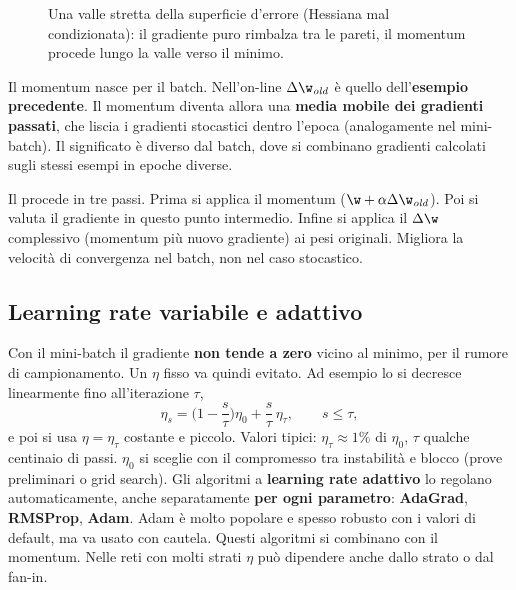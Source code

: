 \begin{figure}[ht]
\centering
{}
\caption{Una valle stretta della superficie d'errore (Hessiana mal condizionata): il gradiente puro rimbalza tra
le pareti, il momentum procede lungo la valle verso il minimo.}
\label{fig:momentum}
\end{figure}

Il momentum nasce per il batch. Nell'on-line $\Delta\w_{\mathit{old}}$ è quello dell'\textbf{esempio
precedente}. Il momentum diventa allora una \textbf{media mobile dei gradienti passati}, che liscia i gradienti
stocastici dentro l'epoca (analogamente nel mini-batch). Il significato è diverso dal batch, dove si combinano
gradienti calcolati sugli stessi esempi in epoche diverse.

Il  procede in tre passi. Prima si applica il momentum
($\w+\alpha\Delta\w_{\mathit{old}}$). Poi si valuta il gradiente in questo punto intermedio. Infine si applica il
$\Delta\w$ complessivo (momentum più nuovo gradiente) ai pesi originali. Migliora la velocità di convergenza nel
batch, non nel caso stocastico.

\subsection{Learning rate variabile e adattivo}

Con il mini-batch il gradiente \textbf{non tende a zero} vicino al minimo, per il rumore di campionamento. Un
$\eta$ fisso va quindi evitato. Ad esempio lo si decresce linearmente fino all'iterazione $\tau$,
\[
\eta_s = \Big(1-\frac{s}{\tau}\Big)\eta_0 + \frac{s}{\tau}\,\eta_\tau,\qquad s\le\tau,
\]
e poi si usa $\eta=\eta_\tau$ costante e piccolo. Valori tipici: $\eta_\tau\approx1\%$ di $\eta_0$, $\tau$ qualche
centinaio di passi. $\eta_0$ si sceglie con il compromesso tra instabilità e blocco (prove preliminari o grid
search). Gli algoritmi a \textbf{learning rate adattivo} lo regolano automaticamente, anche separatamente
\textbf{per ogni parametro}: \textbf{AdaGrad}, \textbf{RMSProp}, \textbf{Adam}. Adam è molto popolare e spesso
robusto con i valori di default, ma va usato con cautela. Questi algoritmi si combinano con il momentum. Nelle
reti con molti strati $\eta$ può dipendere anche dallo strato o dal fan-in.

